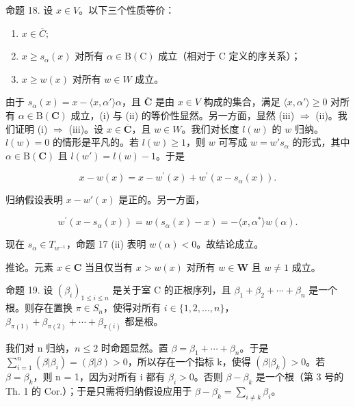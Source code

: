 命题 18. 设 \(x \in V\)。以下三个性质等价：

\begin{enumerate}
\def\labelenumi{(\roman{enumi})}
\item
  \(x \in \overline{C};\)
\item
  \(x \geqslant s_{\alpha}(x)\) 对所有 \(\alpha \in \mathrm{B}(\mathrm{C})\) 成立（相对于 \(\mathrm{C}\) 定义的序关系）；
\item
   \(x \geqslant w(x)\) 对所有 \(w \in W\) 成立。
\end{enumerate}

由于 \(s_{\alpha}(x) = x - \langle x, \alpha' \rangle \alpha\)，且 \(\overline{\mathbf{C}}\) 是由 \(x \in V\) 构成的集合，满足 \(\langle x, \alpha' \rangle \geqslant 0\) 对所有 \(\alpha \in \mathrm{B}(\mathbf{C})\) 成立，(i) 与 (ii) 的等价性显然。另一方面，显然 (iii) \(\Longrightarrow\) (ii)。我们证明 (i) \(\Longrightarrow\) (iii)。设 \(x \in \overline{\mathbf{C}}\)，且 \(w \in W\)。我们对长度 \(l(w)\) 的 \(w\) 归纳。\(l(w) = 0\) 的情形是平凡的。若 \(l(w) \geqslant 1\)，则 \(w\) 可写成 \(w = w's_{\alpha}\) 的形式，其中 \(\alpha \in \mathrm{B}(\mathbf{C})\) 且 \(l(w') = l(w) - 1\)。于是

\[
x - w (x) = x - w ^ {\prime} (x) + w ^ {\prime} \left(x - s _ {\alpha} (x)\right).
\]

归纳假设表明 \(x - w'(x)\) 是正的。另一方面，

\[
w ^ {\prime} (x - s _ {\alpha} (x)) = w \left(s _ {\alpha} (x) - x\right) = - \langle x, \alpha^ {*} \rangle w (\alpha).
\]

现在 \(s_{\alpha} \in T_{w^{-1}}\)，命题 17 (ii) 表明 \(w(\alpha) < 0\)。故结论成立。

推论。元素 \(x \in \mathbf{C}\) 当且仅当有 \(x > w(x)\) 对所有 \(w \in \mathbf{W}\) 且 \(w \neq 1\) 成立。

命题 19. 设 \((\beta_{i})_{1\leqslant i\leqslant n}\) 是关于室 C 的正根序列，且 \(\beta_{1}+\beta_{2}+\cdots+\beta_{n}\) 是一个根。则存在置换 \(\pi\in S_{n}\)，使得对所有 \(i\in\{1,2,\ldots,n\}\)，\(\beta_{\pi(1)}+\beta_{\pi(2)}+\cdots+\beta_{\pi(i)}\) 都是根。

我们对 n 归纳，\(n \leqslant 2\) 时命题显然。置 \(\beta = \beta_{1} + \cdots + \beta_{n}\)。于是 \(\sum_{i=1}^{n} (\beta | \beta_{i}) = (\beta | \beta) > 0\)，所以存在一个指标 k，使得 \((\beta | \beta_{k}) > 0\)。若 \(\beta = \beta_{k}\)，则 n = 1，因为对所有 i 都有 \(\beta_{i} > 0\)。否则 \(\beta - \beta_{k}\) 是一个根（第 3 号的 Th. 1 的 Cor.）；于是只需将归纳假设应用于 \(\beta - \beta_{k} = \sum_{i \neq k} \beta_{i}\)。

